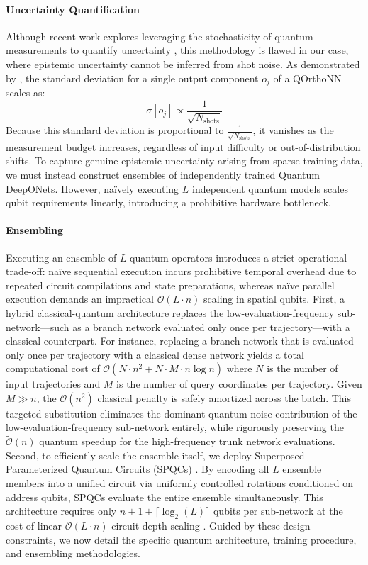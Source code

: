 \documentclass{iopjournal}
\begin{document}
\paragraph{Uncertainty Quantification} Although recent work explores leveraging the stochasticity of quantum measurements to quantify uncertainty \cite{park2023qcp}, this methodology is flawed in our case, where epistemic uncertainty cannot be inferred from shot noise. As demonstrated by \cite{xiao2025qdon}, the standard deviation for a single output component $o_j$ of a QOrthoNN scales as:
\[\sigma[o_j] \propto \frac{1}{\sqrt{N_\mathrm{shots}}}\]
Because this standard deviation is proportional to $\tfrac{1}{\sqrt{N_\mathrm{shots}}}$, it vanishes as the measurement budget increases, regardless of input difficulty or out-of-distribution shifts. To capture genuine epistemic uncertainty arising from sparse training data, we must instead construct ensembles of independently trained Quantum DeepONets. However, naïvely executing $L$ independent quantum models scales qubit requirements linearly, introducing a prohibitive hardware bottleneck.

\paragraph{Ensembling} Executing an ensemble of $L$ quantum operators introduces a strict operational trade-off: naïve sequential execution incurs prohibitive temporal overhead due to repeated circuit compilations and state preparations, whereas naïve parallel execution demands an impractical $\mathcal{O}(L \cdot n)$ scaling in spatial qubits. First, a hybrid classical-quantum architecture replaces the low-evaluation-frequency sub-network—such as a branch network evaluated only once per trajectory—with a classical counterpart. For instance, replacing a branch network that is evaluated only once per trajectory with a classical dense network yields a total computational cost of $\mathcal{O}(N \cdot n^2 + N \cdot M \cdot n \log n)$ where $N$ is the number of input trajectories and $M$ is the number of query coordinates per trajectory. Given $M \gg n$, the $\mathcal{O}(n^2)$ classical penalty is safely amortized across the batch. This targeted substitution eliminates the dominant quantum noise contribution of the low-evaluation-frequency sub-network entirely, while rigorously preserving the $\tilde{\mathcal{O}}(n)$ quantum speedup for the high-frequency trunk network evaluations. Second, to efficiently scale the ensemble itself, we deploy Superposed Parameterized Quantum Circuits (SPQCs) \cite{patapovich2025spqc}. By encoding all $L$ ensemble members into a unified circuit via uniformly controlled rotations conditioned on address qubits, SPQCs evaluate the entire ensemble simultaneously. This architecture requires only $n + 1 + \lceil\log_2(L)\rceil$ qubits per sub-network at the cost of linear $\mathcal{O}(L \cdot n)$ circuit depth scaling \cite{patapovich2025spqc}. Guided by these design constraints, we now detail the specific quantum architecture, training procedure, and ensembling methodologies.
\end{document}
